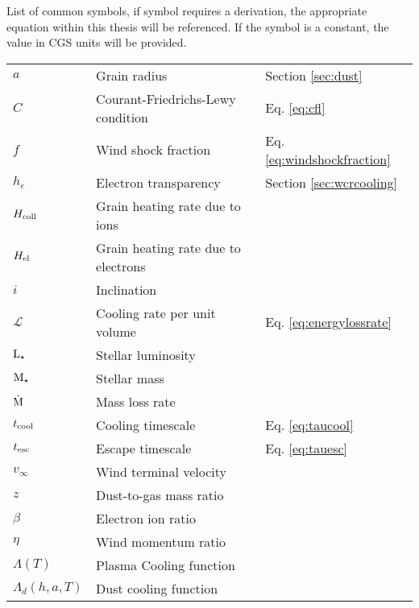 \begin{Common_Symbols}

List of common symbols, if symbol requires a derivation, the appropriate equation within this thesis will be referenced. If the symbol is a constant, the value in CGS units will be provided. 

\begin{longtable}[c]{lll}
  \hline
  \endhead
  \hline
  \endfoot




  \multicolumn{3}{c}{\textbf{Variables}} \\
  \hline

  $a$ & Grain radius & Section \ref{sec:dust} \\
  $C$ & Courant-Friedrichs-Lewy condition & Eq. \ref{eq:cfl} \\ 
  $f$ & Wind shock fraction & Eq. \ref{eq:windshockfraction} \\
  $h_e$ & Electron transparency & Section \ref{sec:wcrcooling} \\
  $H_\text{coll}$ & Grain heating rate due to ions & \\
  $H_\text{el}$ & Grain heating rate due to electrons & \\
  $i$ & Inclination & \\
  $\mathcal{L}$ & Cooling rate per unit volume & Eq. \ref{eq:energylossrate} \\ 
  $\text{L}_\star$ & Stellar luminosity & \\
  $\text{M}_\star$ & Stellar mass & \\
  $\dot{\text{M}}$ & Mass loss rate & \\
  $t_\text{cool}$ & Cooling timescale & Eq. \ref{eq:taucool} \\
  $t_\text{esc}$ & Escape timescale & Eq. \ref{eq:tauesc} \\
  $v_\infty$ & Wind terminal velocity & \\
  $z$ & Dust-to-gas mass ratio  & \\


  $\beta$ & Electron ion ratio & \\
  $\eta$ & Wind momentum ratio  & \\
  
  $\Lambda(T)$ & Plasma Cooling function & \\
  $\Lambda_d(h,a,T)$ & Dust cooling function & \\


\end{longtable}
\end{Common_Symbols}
